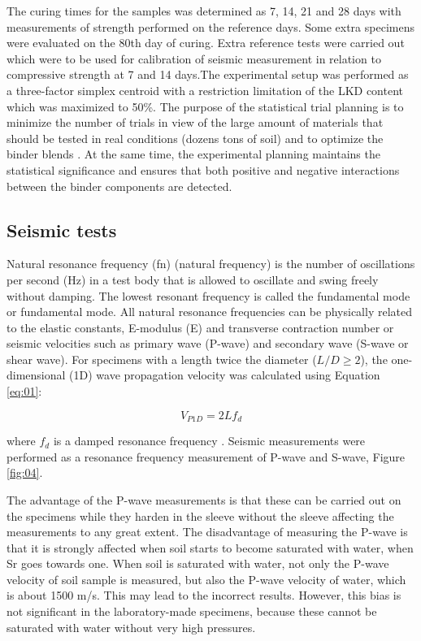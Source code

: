 \documentclass[final,3p,times,twocolumn]{elsarticle}
\begin{document}
The curing times for the samples was determined as 7, 14, 21 and 28 days with measurements of strength performed on the reference days. Some extra specimens were evaluated on the 80th day of curing. Extra reference tests were carried out which were to be used for calibration of seismic measurement in relation to compressive strength at 7 and 14 days.The experimental setup was performed as a three-factor simplex centroid with a restriction limitation of the LKD content which was maximized to 50\%. The purpose of the statistical trial planning is to minimize the number of trials in view of the large amount of materials that should be tested in real conditions (dozens tons of soil) and to optimize the binder blends \cite{Lindh2001}. At the same time, the experimental planning maintains the statistical significance and ensures that both positive and negative interactions between the binder components are detected. 

\subsection{Seismic tests}

Natural resonance frequency (fn) (natural frequency) is the number of oscillations per second (Hz) in a test body that is allowed to oscillate and swing freely without damping. The lowest resonant frequency is called the fundamental mode or fundamental mode. All natural resonance frequencies can be physically related to the elastic constants, E-modulus (E) and transverse contraction number or seismic velocities such as primary wave (P-wave) and secondary wave (S-wave or shear wave). For specimens with a length twice the diameter ($L/D\geq2$), the one-dimensional (1D) wave propagation velocity was calculated using Equation \ref{eq:01}:

\begin{equation}\label{eq:01}
	V_{P1D} =2Lf_d
\end{equation}

where $f_d$ is a damped resonance frequency \cite{Rydenetal2006}.
Seismic measurements were performed as a resonance frequency measurement of P-wave and S-wave, Figure \ref{fig:04}.

The advantage of the P-wave measurements is that these can be carried out on the specimens while they harden in the sleeve without the sleeve affecting the measurements to any great extent. The disadvantage of measuring the P-wave is that it is strongly affected when soil starts to become saturated with water, when Sr goes towards one. When soil is saturated with water, not only the P-wave velocity of soil sample is measured, but also the P-wave velocity of water, which is about 1500 m/s. This may lead to the incorrect results. However, this bias is not significant in the laboratory-made specimens, because these cannot be saturated with water without very high pressures. 
\end{document}
